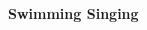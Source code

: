 \documentclass[10pt,a4paper,ragged2e,withhyper]{altacv}
\begin{document}
\begin{paracol}{2}
\bigskip
\bigskip
\smallskip
\vspace{1pt}


{\Large\color{accent}\faSwimmer} \bfseries\textcolor{emphasis}{Swimming}
\hspace{80pt}
{\Large\color{accent}\faMicrophone} \bfseries\textcolor{emphasis}{Singing}
\\










\newpage







\end{paracol}
\end{document}
